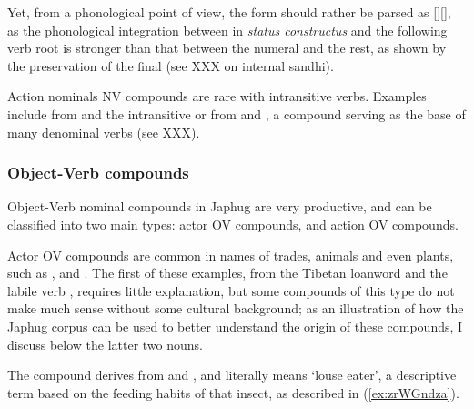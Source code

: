 Yet, from a phonological point of view, the form should rather be parsed as [][], as the phonological integration between  in \textit{status constructus} and the following verb root is stronger than that between the numeral  and the rest, as shown by the preservation of the final  (see XXX on internal sandhi).

Action nominals NV compounds are rare with intransitive verbs. Examples include  from  and the intransitive  or  from   and , a compound serving as the base of many denominal verbs (see XXX).

 
\subsubsection{Object-Verb compounds} \label{sec:object.verb.compounds}
Object-Verb nominal compounds in Japhug are very productive, and can be classified into two main types: actor OV compounds, and action OV compounds.

Actor OV compounds are common in names of trades, animals and even plants, such as ,  and . The first of these examples, from the Tibetan loanword  and the labile verb , requires little explanation, but some compounds of this type do not make much sense without some cultural background; as an illustration of how the Japhug corpus can be used to better understand the origin of these compounds, I discuss below the latter two nouns.

The compound  derives from  and , and literally means `louse eater', a descriptive term based on the feeding habits of that insect, as described in (\ref{ex:zrWGndza}).

